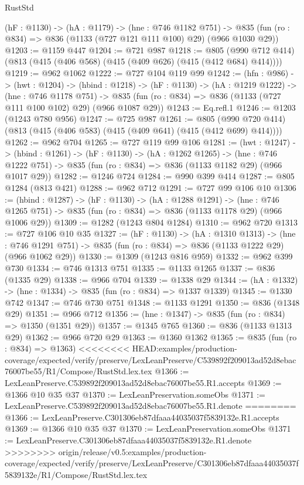 \begin{lexlean}{RustStd}
\begin{coremodule}
{\begin{coremodule}
  (hF : @1130) ->
  (hA : @1179) ->
  (hne : @746 @1182 @751) ->
  @835 (fun (ro : @834) => @836 (@1133 (@727 @121 @111 @100) @29) (@966 @1030 @29))
@1203 := @1159 @447
@1204 := @721 @987
@1218 := @805 (@990 @712 @414) (@813 (@415 (@406 @568) (@415 (@409 @626) (@415 (@412 @684) @414))))
@1219 := @962 @1062
@1222 := @727 @104 @119 @99
@1242 := (hfn : @986) ->
  (hwt : @1204) ->
  (hbind : @1218) ->
  (hF : @1130) ->
  (hA : @1219 @1222) ->
  (hne : @746 @1178 @751) ->
  @835 (fun (ro : @834) => @836 (@1133 (@727 @111 @100 @102) @29) (@966 @1087 @29))
@1243 := Eq.refl.{1}
@1246 := @1203 (@1243 @780 @956)
@1247 := @725 @987
@1261 := @805 (@990 @720 @414) (@813 (@415 (@406 @583) (@415 (@409 @641) (@415 (@412 @699) @414))))
@1262 := @962 @704
@1265 := @727 @119 @99 @106
@1281 := (hwt : @1247) ->
  (hbind : @1261) ->
  (hF : @1130) ->
  (hA : @1262 @1265) ->
  (hne : @746 @1222 @751) -> @835 (fun (ro : @834) => @836 (@1133 @1182 @29) (@966 @1017 @29))
@1282 := @1246 @724
@1284 := @990 @399 @414
@1287 := @805 @1284 (@813 @421)
@1288 := @962 @712
@1291 := @727 @99 @106 @10
@1306 := (hbind : @1287) ->
  (hF : @1130) ->
  (hA : @1288 @1291) ->
  (hne : @746 @1265 @751) -> @835 (fun (ro : @834) => @836 (@1133 @1178 @29) (@966 @1006 @29))
@1309 := @1282 (@1243 @804 @1284)
@1310 := @962 @720
@1313 := @727 @106 @10 @35
@1327 := (hF : @1130) ->
  (hA : @1310 @1313) ->
  (hne : @746 @1291 @751) -> @835 (fun (ro : @834) => @836 (@1133 @1222 @29) (@966 @1062 @29))
@1330 := @1309 (@1243 @816 @959)
@1332 := @962 @399 @730
@1334 := @746 @1313 @751
@1335 := @1133 @1265
@1337 := @836 (@1335 @29)
@1338 := @966 @704
@1339 := @1338 @29
@1344 := (hA : @1332) -> (hne : @1334) -> @835 (fun (ro : @834) => @1337 @1339)
@1345 := @1330 @742
@1347 := @746 @730 @751
@1348 := @1133 @1291
@1350 := @836 (@1348 @29)
@1351 := @966 @712
@1356 := (hne : @1347) -> @835 (fun (ro : @834) => @1350 (@1351 @29))
@1357 := @1345 @765
@1360 := @836 (@1133 @1313 @29)
@1362 := @966 @720 @29
@1363 := @1360 @1362
@1365 := @835 (fun (ro : @834) => @1363)
<<<<<<<< HEAD:examples/production-coverage/expected/verify/preserve/LexLeanPreserve/C539892f209013ad52d8ebac76007be55/R1/Compose/RustStd.lex.tex
@1366 := LexLeanPreserve.C539892f209013ad52d8ebac76007be55.R1.accepts
@1369 := @1366 @10 @35 @37
@1370 := LexLeanPreservation.someObs
@1371 := LexLeanPreserve.C539892f209013ad52d8ebac76007be55.R1.denote
========
@1366 := LexLeanPreserve.C301306eb87dfaaa44035037f5839132e.R1.accepts
@1369 := @1366 @10 @35 @37
@1370 := LexLeanPreservation.someObs
@1371 := LexLeanPreserve.C301306eb87dfaaa44035037f5839132e.R1.denote
>>>>>>>> origin/release/v0.5:examples/production-coverage/expected/verify/preserve/LexLeanPreserve/C301306eb87dfaaa44035037f5839132e/R1/Compose/RustStd.lex.tex

\end{coremodule}}
\end{coremodule}
\end{lexlean}
